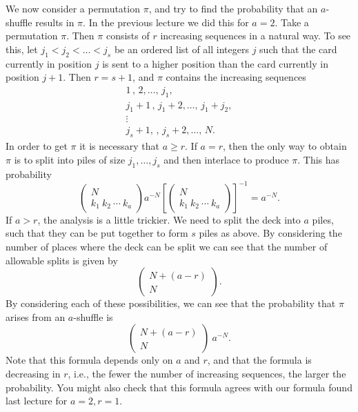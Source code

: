 \documentclass{stml-l}
\theoremstyle{definition}
\numberwithin{equation}{chapter}
\numberwithin{figure}{chapter}
\numberwithin{figure}{section}
\begin{document}
We now consider a permutation $\pi$, and try to find the probability
that an $a$-shuffle results in $\pi$. In the previous lecture we did
this for $a=2$. Take a permutation $\pi$. Then $\pi$ consists of $r$
increasing sequences in a natural way. To see this, let
$j_{1}<j_{2}<\ldots<j_{s}$ be an ordered list of all integers $j$
such that the card currently in position $j$ is sent to a higher
position than the card currently in position $j+1$. Then $r=s+1$,
and $\pi$ contains the increasing sequences
\begin{gather*}
1\,,\,2,\ldots,\,j_{1},\\
j_{1}+1\,,\,j_{1}+2,\ldots,\,j_{1}+j_{2},\\
\vdots\\
j_{s}+1,\,,\,j_{s}+2,\ldots,\,N.
\end{gather*}
In order to get $\pi$ it is necessary that $a\geq r$. If $a=r$, then
the only way to obtain $\pi$ is to split into piles of size
$j_{1},\ldots,j_{s}$ and then interlace to produce $\pi$. This has
probability
\begin{equation*}
\left(\begin{matrix}
N \\
k_{1}\ k_{2}\ \cdots\ k_{a}
\end{matrix}\right) a^{-N}\left[\left(\begin{matrix}
N\\
k_{1}\ k_{2}\ \cdots\ k_{a}
\end{matrix}\right)\right]^{-1}=a^{-N}.
\end{equation*}
If $a>r$, the analysis is a little trickier. We need to split the
deck into $a$ piles, such that they can be put together to form $s$
piles as above. By considering the number of places where the deck
can be split we can see that the number of allowable splits is given
by
\begin{equation*}
\left(\begin{matrix}
N+(a-r)\\
N
\end{matrix}\right).
\end{equation*}
By considering each of these possibilities, we can see that the
probability that $\pi$ arises from an $a$-shuffle is
\begin{equation*}
\left(\begin{matrix}
N+(a-r)\\
N
\end{matrix}\right)\ a^{-N}.
\end{equation*}
Note that this formula depends only on $a$ and $r$, and that the
formula is decreasing in $r$, i.e., the fewer the number of
increasing sequences, the larger the probability. You might also
check that this formula agrees with our formula found last lecture
for $a=2,r=1$.
\end{document}
